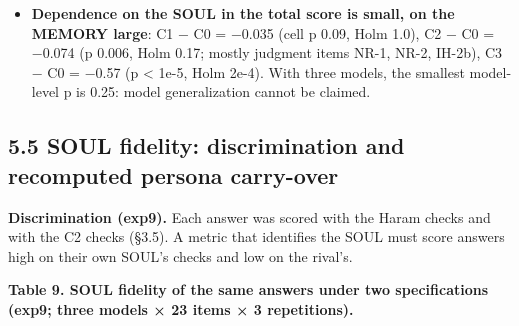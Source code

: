 \documentclass[10pt]{article}
\begin{document}
\begin{itemize}
\item
  \textbf{Dependence on the SOUL in the total score is small, on the MEMORY large}: C1 − C0 = −0.035 (cell p 0.09, Holm 1.0), C2 − C0 = −0.074 (p 0.006, Holm 0.17; mostly judgment items NR-1, NR-2, IH-2b), C3 − C0 = −0.57 (p \textless{} 1e-5, Holm 2e-4). With three models, the smallest model-level p is 0.25: model generalization cannot be claimed.
\end{itemize}

\subsection{5.5 SOUL fidelity: discrimination and recomputed persona carry-over}\label{soul-fidelity-discrimination-and-recomputed-persona-carry-over}

\textbf{Discrimination (exp9).} Each answer was scored with the Haram checks and with the C2 checks (§3.5). A metric that identifies the SOUL must score answers high on their own SOUL's checks and low on the rival's.

\textbf{Table 9. SOUL fidelity of the same answers under two specifications (exp9; three models × 23 items × 3 repetitions).}
\end{document}
